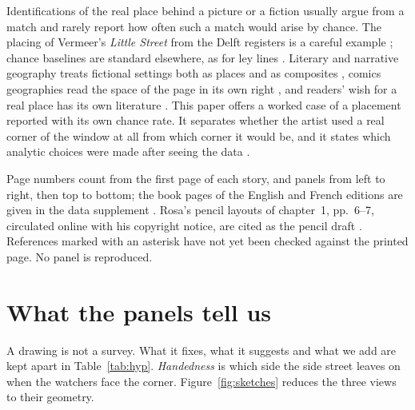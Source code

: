 \documentclass[10pt,a4paper]{article}
\begin{document}
Identifications of the real place behind a picture or a fiction usually argue from a match and rarely report how often such a match would arise by chance. The placing of Vermeer's \emph{Little Street} from the Delft registers is a careful example \citep{grijzenhout2015little}; chance baselines are standard elsewhere, as for ley lines \citep{broadbent1980ley}. Literary and narrative geography treats fictional settings both as places and as composites \citep{piatti2009mapping,hones2014literary,saunders2010literary,caquard2013narrative}, comics geographies read the space of the page in its own right \citep{dittmer2010visualities,peterle2017comic,laurier2014graphic}, and readers' wish for a real place has its own literature \citep{reijnders2011places}. This paper offers a worked case of a placement reported with its own chance rate. It separates whether the artist used a real corner of the window at all from which corner it would be, and it states which analytic choices were made after seeing the data \citep{gelman2014crisis,steegen2016multiverse}.

Page numbers count from the first page of each story, and panels from left to right, then top to bottom; the book pages of the English and French editions are given in the data supplement \citep{rosa2015library4,rosa2012glenat1,rosa2012glenat2}. Rosa's pencil layouts of chapter~1, pp.~6--7, circulated online with his copyright notice, are cited as the pencil draft \citep{rosaPencils}. References marked with an asterisk have not yet been checked against the printed page. No panel is reproduced.

\section{What the panels tell us}\label{sec:panels}
A drawing is not a survey. What it fixes, what it suggests and what we add are kept apart in Table~\ref{tab:hyp}. \emph{Handedness} is which side the side street leaves on when the watchers face the corner. Figure~\ref{fig:sketches} reduces the three views to their geometry.
\end{document}
